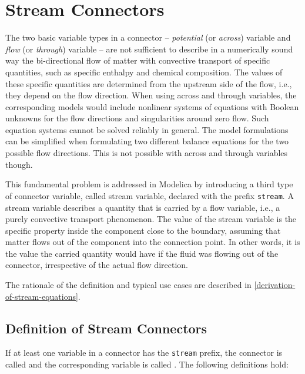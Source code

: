 \chapter{Stream Connectors}


The two basic variable types in a connector -- \emph{potential} (or \emph{across})
variable and \emph{flow} (or \emph{through}) variable -- are not sufficient to
describe in a numerically sound way the bi-directional flow of matter
with convective transport of specific quantities, such as specific
enthalpy and chemical composition. The values of these specific
quantities are determined from the upstream side of the flow, i.e., they
depend on the flow direction. When using across and through variables,
the corresponding models would include nonlinear systems of equations
with Boolean unknowns for the flow directions and singularities around
zero flow. Such equation systems cannot be solved reliably in general.
The model formulations can be simplified when formulating two different
balance equations for the two possible flow directions. This is not
possible with across and through variables though.

This fundamental problem is addressed in Modelica by introducing a third
type of connector variable, called stream variable, declared with the
prefix \lstinline!stream!. A stream variable describes a quantity that is
carried by a flow variable, i.e., a purely convective transport
phenomenon. The value of the stream variable is the specific property
inside the component close to the boundary, assuming that matter flows
out of the component into the connection point. In other words, it is
the value the carried quantity would have if the fluid was flowing out
of the connector, irrespective of the actual flow direction.

The rationale of the definition and typical use cases are described in
\autoref{derivation-of-stream-equations}.

\section{Definition of Stream Connectors}

If at least one variable in a connector has the \lstinline!stream! prefix,
the connector is called  and the corresponding
variable is called . The following definitions hold:

